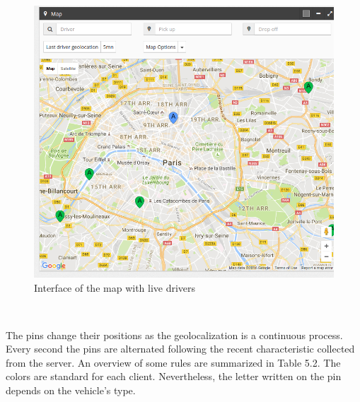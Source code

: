 \begin{figure}[!htbp] 
\begin{center}
\includegraphics[width=6 in]{images/achievement/1.png}
\caption{Interface of the map with live drivers}
\label{int1}
\end{center}
\end{figure}~

The pins change their positions as the geolocalization is a continuous process. Every second the pins are alternated following the recent characteristic collected from the server. An overview of some rules are summarized in Table 5.2. The colors are standard for each client. Nevertheless, the letter written on the pin depends on the vehicle's type.



